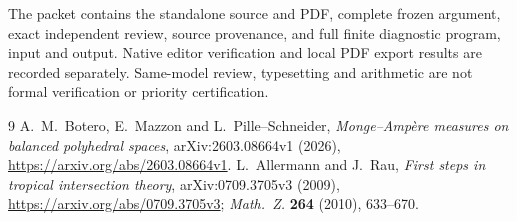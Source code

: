 \documentclass[
  11pt,
]{article}
\begin{document}
The packet contains the standalone source and PDF, complete frozen
argument, exact independent review, source provenance, and full finite
diagnostic program, input and output. Native editor verification and
local PDF export results are recorded separately. Same-model review,
typesetting and arithmetic are not formal verification or priority
certification.

\begin{thebibliography}{9}
A.~M.~Botero, E.~Mazzon and L.~Pille--Schneider,
\emph{Monge--Amp\`ere measures on balanced polyhedral spaces},
arXiv:2603.08664v1 (2026),
\url{https://arxiv.org/abs/2603.08664v1}.
L.~Allermann and J.~Rau,
\emph{First steps in tropical intersection theory},
arXiv:0709.3705v3 (2009),
\url{https://arxiv.org/abs/0709.3705v3};
\emph{Math.~Z.} \textbf{264} (2010), 633--670.
\end{thebibliography}
\end{document}
